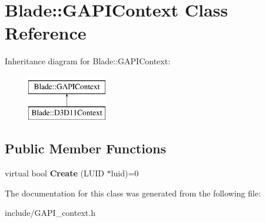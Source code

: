 \hypertarget{class_blade_1_1_g_a_p_i_context}{}\section{Blade\+:\+:G\+A\+P\+I\+Context Class Reference}
\label{class_blade_1_1_g_a_p_i_context}
Inheritance diagram for Blade\+:\+:G\+A\+P\+I\+Context\+:\begin{figure}[H]
\begin{center}
\leavevmode
\includegraphics[height=2.000000cm]{class_blade_1_1_g_a_p_i_context}
\end{center}
\end{figure}
\subsection*{Public Member Functions}
\begin{DoxyCompactItemize}
\item 
\mbox{\label{class_blade_1_1_g_a_p_i_context_a665c1f1b87abb9128ee009debed3e0e9}} 
virtual bool {\bfseries Create} (L\+U\+ID $\ast$luid)=0
\end{DoxyCompactItemize}


The documentation for this class was generated from the following file\+:\begin{DoxyCompactItemize}
\item 
include/G\+A\+P\+I\+\_\+context.\+h\end{DoxyCompactItemize}
